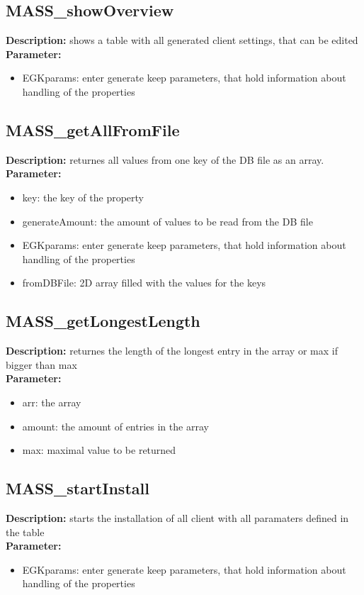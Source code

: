 \subsection{MASS\_showOverview}
\textbf{Description:} shows a table with all generated client settings, that can be edited\\
\textbf{Parameter:}
\begin{itemize}
\item EGKparams: enter generate keep parameters, that hold information about handling of the properties
\end{itemize}

\subsection{MASS\_getAllFromFile}
\textbf{Description:} returnes all values from one key of the DB file as an array.\\
\textbf{Parameter:}
\begin{itemize}
\item key: the key of the property
\item generateAmount: the amount of values to be read from the DB file
\item EGKparams: enter generate keep parameters, that hold information about handling of the properties
\item fromDBFile: 2D array filled with the values for the keys
\end{itemize}

\subsection{MASS\_getLongestLength}
\textbf{Description:} returnes the length of the longest entry in the array or max if bigger than max\\
\textbf{Parameter:}
\begin{itemize}
\item arr: the array
\item amount: the amount of entries in the array
\item max: maximal value to be returned
\end{itemize}

\subsection{MASS\_startInstall}
\textbf{Description:} starts the installation of all client with all paramaters defined in the table\\
\textbf{Parameter:}
\begin{itemize}
\item EGKparams: enter generate keep parameters, that hold information about handling of the properties
\end{itemize}

